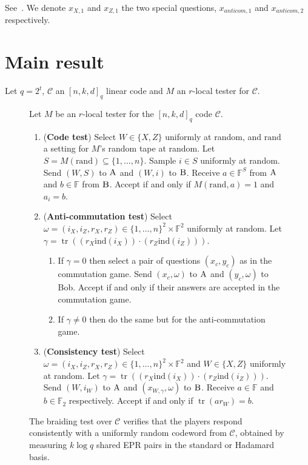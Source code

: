 \documentclass[11pt]{article}
\theoremstyle{definition}
\newcommand{\code}{\mathcal{C}}
\newcommand{\field}{\mathbb{F}}
\newcommand{\F}{\ensuremath{\mathbb{F}}}
\newcommand{\ind}{\ensuremath{\mathrm{ind}}}
\newcommand{\rand}{\textrm{rand}}
\DeclareMathOperator{\tr}{tr}
\newcommand{\labelstyle}[1]{\ensuremath{\textsc{#1}}\xspace}
\newcommand{\alice}{\labelstyle{A}}
\newcommand{\bob}{\labelstyle{B}}
\newenvironment{gamespec}{
  \begin{mdframed}[style=figstyle]}{
  \end{mdframed}}
\begin{document}
See~\cite[Section 3.2]{de2022spectral}. We denote $x_{X,1}$ and $x_{Z,1}$ the two special questions, $x_{anticom,1}$ and $x_{anticom,2}$ respectively. 

\section{Main result}

Let $q=2^t$, $\code$ an $[n,k,d]_q$ linear code and $M$ an $r$-local tester for $\code$. 


\begin{figure}[!htbp]
  \centering
  \begin{gamespec}
Let $M$ be an $r$-local tester for the $[n,k,d]_q$ code $\code$. 
    \begin{enumerate}
      \setlength\itemsep{1pt}
    \item (\textbf{Code test}) Select $W\in \{X,Z\}$ uniformly at random, and $\rand$ a setting for $M$'s random tape at random. Let $S=M(\rand)\subseteq\{1,\ldots,n\}$. Sample $i\in S$ uniformly at random. Send $(W,S)$ to $\alice$ and $(W,i)$ to $\bob$. Receive $a\in \field^S$ from $\alice$ and $b\in \field$ from $\bob$. Accept if and only if $M(\rand,a)=1$ and $a_i = b$.  
    \item (\textbf{Anti-commutation test}) Select $\omega=(i_X,i_Z,r_X,r_Z)\in \{1,\ldots,n\}^2 \times \field^2$ uniformly at random. Let $\gamma = \tr( (r_X\ind(i_X))\cdot  (r_Z \ind(i_Z)))$.
		\begin{enumerate}
		\item If $\gamma=0$ then select a pair of questions $(x_c,y_c)$ as in the commutation game. Send $(x_c,\omega)$ to $\alice$ and $(y_c,\omega)$ to Bob. Accept if and only if their answers are accepted in the commutation game. 
		\item If $\gamma\neq 0$ then do the same but for the anti-commutation game. 
		\end{enumerate} 
		 \item (\textbf{Consistency test}) Select $\omega=(i_X,i_Z,r_X,r_Z)\in \{1,\ldots,n\}^2 \times \field^2$ and $W\in \{X,Z\}$ uniformly at random. Let $\gamma = \tr( (r_X\ind(i_X))\cdot  (r_Z \ind(i_Z)))$. Send $(W,i_W)$ to $\alice$ and $(x_{W,\gamma},\omega)$ to $\bob$. Receive $a\in \field$ and $b\in \F_2$ respectively. Accept if and only if $\tr(a r_W)=b$. 
    \end{enumerate}
  \end{gamespec}
  \caption{The braiding test over $\code$ verifies that the players respond consistently with a uniformly random codeword from $\code$, obtained by measuring $k\log q$ shared EPR pairs in the standard or Hadamard basis.}
  \label{fig:braiding-test}
\end{figure}
\end{document}
